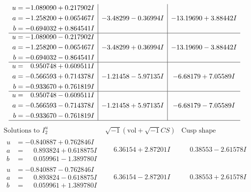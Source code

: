 \documentclass[1p]{elsarticle_modified}
\theoremstyle{definition}
\newcommand{\I}{\sqrt{-1}}
\begin{document}
$$\begin{array}{c|c|c}
\begin{aligned}
u &= -1.089090 + 0.217902 I \\
a &= -1.258200 + 0.065467 I \\
b &= -0.694032 + 0.864541 I\end{aligned}
 & -3.48299 - 0.36994 I & -13.19690 + 3.88442 I \\ \hline\begin{aligned}
u &= -1.089090 - 0.217902 I \\
a &= -1.258200 - 0.065467 I \\
b &= -0.694032 - 0.864541 I\end{aligned}
 & -3.48299 + 0.36994 I & -13.19690 - 3.88442 I \\ \hline\begin{aligned}
u &= \phantom{-}0.950748 + 0.609511 I \\
a &= -0.566593 + 0.714378 I \\
b &= -0.933670 + 0.761819 I\end{aligned}
 & -1.21458 - 5.97135 I & -6.68179 + 7.05589 I \\ \hline\begin{aligned}
u &= \phantom{-}0.950748 - 0.609511 I \\
a &= -0.566593 - 0.714378 I \\
b &= -0.933670 - 0.761819 I\end{aligned}
 & -1.21458 + 5.97135 I & -6.68179 - 7.05589 I\\
 \hline 
 \end{array}$$\newpage$$\begin{array}{c|c|c}  
\text{Solutions to }I^u_{2}& \I (\text{vol} + \sqrt{-1}CS) & \text{Cusp shape}\\
 \hline 
\begin{aligned}
u &= -0.840887 + 0.762846 I \\
a &= \phantom{-}0.893824 + 0.618875 I \\
b &= \phantom{-}0.059961 - 1.389780 I\end{aligned}
 & \phantom{-}6.36154 + 2.87201 I & \phantom{-}0.38553 - 2.61578 I \\ \hline\begin{aligned}
u &= -0.840887 - 0.762846 I \\
a &= \phantom{-}0.893824 - 0.618875 I \\
b &= \phantom{-}0.059961 + 1.389780 I\end{aligned}
 & \phantom{-}6.36154 - 2.87201 I & \phantom{-}0.38553 + 2.61578 I \\ \hline\begin{aligned}

\end{aligned}
\end{array}$$
\end{document}
